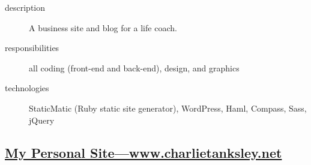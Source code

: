 \documentclass{article}
\begin{document}
\begin{multicols}{2}

\begin{description}
  \item[description] A business site and blog for a life coach. 
  \item[responsibilities] all coding (front-end and back-end), design, and graphics 
  \item[technologies] StaticMatic (Ruby static site generator), WordPress, Haml, Compass, Sass, jQuery 
\end{description}

\vfill
\columnbreak
{}
\end{multicols}


\subsection{\href{http://www.charlietanksley.net}
  {My Personal Site---www.charlietanksley.net}}
\label{sub:My Personal Site}
\end{document}
